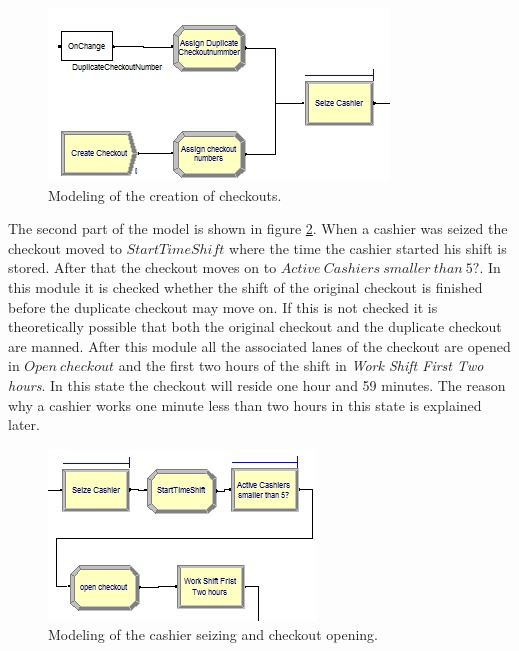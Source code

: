 \begin{figure}[h!]
\begin{center}
	\includegraphics[scale=1]{images/model-description/checkout-creation.PNG}
	\caption{Modeling of the creation of checkouts.}
	\label{fig:createcheckouts}
\end{center}
\end{figure}

The second part of the model is shown in figure \ref{fig:seizeandopen}. 
When a cashier was seized the checkout moved to $StartTimeShift$ where the time the cashier started his shift is stored. 
After that the checkout moves on to $Active \ Cashiers \ smaller \ than \ 5?$. 
In this module it is checked whether the shift of the original checkout is finished before the duplicate checkout may move on. 
If this is not checked it is theoretically possible that both the original checkout and the duplicate checkout are manned. 
After this module all the associated lanes of the checkout are opened in $Open \ checkout$ and the first two hours of the shift in \textit{Work Shift First Two hours}. 
In this state the checkout will reside one hour and 59 minutes. 
The reason why a cashier works one minute less than two hours in this state is explained later. 

\begin{figure}[h!]
\begin{center}
	\includegraphics[scale=1]{images/model-description/seize-and-open.PNG}
	\caption{Modeling of the cashier seizing and checkout opening.}
	\label{fig:seizeandopen}
\end{center}
\end{figure}

